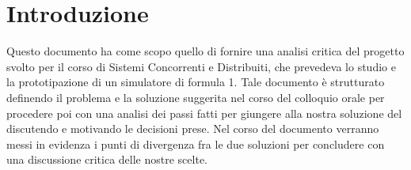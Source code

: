 \section{Introduzione}
Questo documento ha come scopo quello di fornire una analisi critica del progetto svolto per il corso di Sistemi Concorrenti e Distribuiti, che prevedeva lo studio e la prototipazione di un simulatore di formula 1. Tale documento è strutturato definendo il problema e la soluzione suggerita nel corso del colloquio orale per procedere poi con una analisi dei passi fatti per giungere alla nostra soluzione del discutendo e motivando le decisioni prese. Nel corso del documento verranno messi in evidenza i punti di divergenza fra le due soluzioni per concludere con una discussione critica delle nostre scelte.